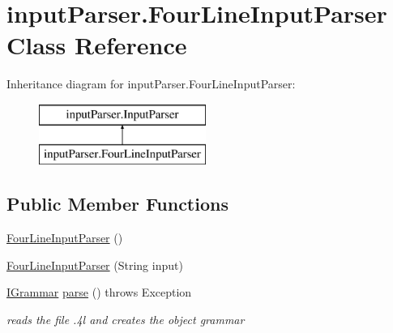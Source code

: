 \hypertarget{classinput_parser_1_1_four_line_input_parser}{\section{input\-Parser.\-Four\-Line\-Input\-Parser Class Reference}
\label{classinput_parser_1_1_four_line_input_parser}
}
Inheritance diagram for input\-Parser.\-Four\-Line\-Input\-Parser\-:\begin{figure}[H]
\begin{center}
\leavevmode
\includegraphics[height=2.000000cm]{classinput_parser_1_1_four_line_input_parser}
\end{center}
\end{figure}
\subsection*{Public Member Functions}
\begin{DoxyCompactItemize}
\item 
\hyperlink{classinput_parser_1_1_four_line_input_parser_ac43250e1717959ba2653fa7a17820dbf}{Four\-Line\-Input\-Parser} ()
\item 
\hyperlink{classinput_parser_1_1_four_line_input_parser_ab60c07b777f5edc493d0d71abcfdc840}{Four\-Line\-Input\-Parser} (String input)
\item 
\hyperlink{interfacecontext_free_1_1grammar_1_1_i_grammar}{I\-Grammar} \hyperlink{classinput_parser_1_1_four_line_input_parser_a99c37488d66cfeecb33e13d573b4a81a}{parse} ()  throws Exception
\begin{DoxyCompactList}\small\item\em reads the file .4l and creates the object grammar \end{DoxyCompactList}\end{DoxyCompactItemize}
